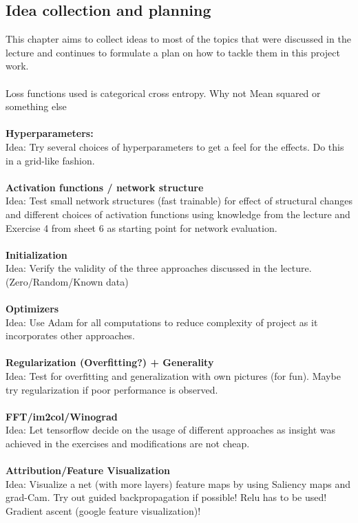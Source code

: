 \documentclass{article}
\begin{document}
\begin{multicols}{2}
\section{Idea collection and planning}
\label{ideas}
This chapter aims to collect ideas to most of the topics that were discussed in the lecture and continues to formulate a plan on how to tackle them in this project work.\\
\\
Loss functions used is categorical cross entropy. Why not Mean squared or something else\\
\\
\textbf{Hyperparameters:}\\
Idea: Try several choices of hyperparameters to get a feel for the effects. Do this in a grid-like fashion.\\
\\
\textbf{Activation functions / network structure}\\
Idea: Test small network structures (fast trainable) for effect of structural changes and different choices of activation functions using knowledge from the lecture and Exercise 4 from sheet 6 as starting point for network evaluation.\\
\\
\textbf{Initialization}\\
Idea: Verify the validity of the three approaches discussed in the lecture. (Zero/Random/Known data)\\
\\
\textbf{Optimizers}\\
Idea: Use Adam for all computations to reduce complexity of project as it incorporates other approaches.\\
\\
\textbf{Regularization (Overfitting?) + Generality}\\
Idea: Test for overfitting and generalization with own pictures (for fun). Maybe try regularization if poor performance is observed.\\
\\
\textbf{FFT/im2col/Winograd}\\
Idea: Let tensorflow decide on the usage of different approaches as insight was achieved in the exercises and modifications are not cheap.\\
\\
\textbf{Attribution/Feature Visualization}\\
Idea: Visualize a net (with more layers) feature maps by using Saliency maps and grad-Cam. Try out guided backpropagation if possible! Relu has to be used! Gradient ascent (google feature visualization)!\\

\end{multicols}
\end{document}
